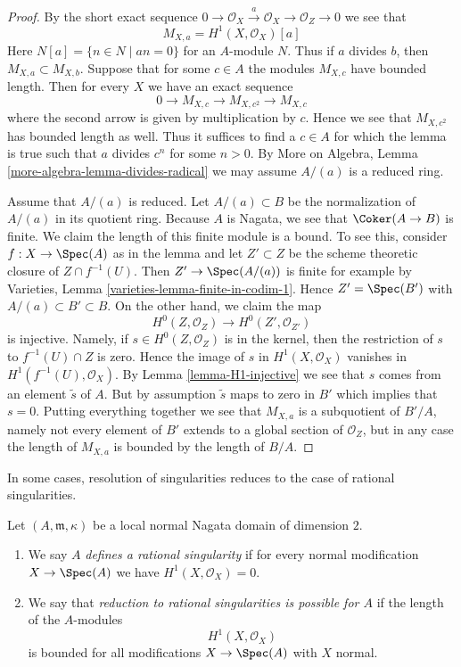 \begin{proof}
By the short exact sequence
$
0 \to \mathcal{O}_X \xrightarrow{a} \mathcal{O}_X \to \mathcal{O}_Z \to 0
$
we see that
\begin{equation}
\label{equation-a-torsion}
M_{X, a} = H^1(X, \mathcal{O}_X)[a]
\end{equation}
Here $N[a] = \{n \in N \mid an = 0\}$ for an $A$-module $N$. Thus
if $a$ divides $b$, then $M_{X, a} \subset M_{X, b}$.
Suppose that for some $c \in A$ the modules $M_{X, c}$
have bounded length. Then for every $X$ we have an exact sequence
$$
0 \to M_{X, c} \to M_{X, c^2} \to M_{X, c}
$$
where the second arrow is given by multiplication by $c$. Hence we see that
$M_{X, c^2}$ has bounded length as well. Thus it suffices to find a $c \in A$
for which the lemma is true such that $a$ divides $c^n$ for some $n > 0$.
By More on Algebra, Lemma \ref{more-algebra-lemma-divides-radical}
we may assume $A/(a)$ is a reduced ring.

\medskip\noindent
Assume that $A/(a)$ is reduced. Let $A/(a) \subset B$ be the normalization
of $A/(a)$ in its quotient ring. Because $A$ is Nagata, we see that
$\Coker(A \to B)$ is finite. We claim the length of this finite
module is a bound. To see this, consider $f : X \to \Spec(A)$ as in the lemma
and let $Z' \subset Z$ be the scheme theoretic closure of $Z \cap f^{-1}(U)$.
Then $Z' \to \Spec(A/(a))$ is finite for example by Varieties, Lemma
\ref{varieties-lemma-finite-in-codim-1}.
Hence $Z' = \Spec(B')$ with $A/(a) \subset B' \subset B$.
On the other hand, we claim the map
$$
H^0(Z, \mathcal{O}_Z) \to H^0(Z', \mathcal{O}_{Z'})
$$
is injective. Namely, if $s \in H^0(Z, \mathcal{O}_Z)$
is in the kernel, then
the restriction of $s$ to $f^{-1}(U) \cap Z$ is zero.
Hence the image of $s$ in $H^1(X, \mathcal{O}_X)$ vanishes in
$H^1(f^{-1}(U), \mathcal{O}_X)$. By Lemma \ref{lemma-H1-injective}
we see that $s$ comes from an element $\tilde s$ of $A$. But by
assumption $\tilde s$ maps to zero in $B'$ which implies that $s = 0$.
Putting everything together we see that
$M_{X, a}$ is a subquotient of $B'/A$, namely not every element
of $B'$ extends to a global section of $\mathcal{O}_Z$, but in
any case the length of $M_{X, a}$ is bounded by the length of $B/A$.
\end{proof}

\noindent
In some cases, resolution of singularities reduces to the case
of rational singularities.

\begin{definition}
\label{definition-reduce-to-rational}
Let $(A, \mathfrak m, \kappa)$ be a local normal Nagata domain
of dimension $2$.
\begin{enumerate}
\item We say $A$ {\it defines a rational singularity} if for every
normal modification $X \to \Spec(A)$ we have $H^1(X, \mathcal{O}_X) = 0$.
\item We say that {\it reduction to rational singularities
is possible for $A$} if the length of the $A$-modules
$$
H^1(X, \mathcal{O}_X)
$$
is bounded for all modifications $X \to \Spec(A)$ with $X$ normal.
\end{enumerate}
\end{definition}

